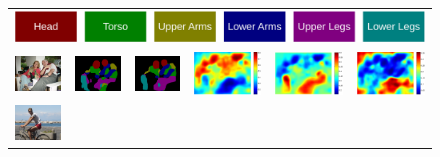 \begin{figure}
  \centering
  \begin{tabular}{c c c c c c}
   \multicolumn{6}{c}{\includegraphics[width=0.5\linewidth]{fig/voc10_part/legend.pdf}} \\
   \includegraphics[height=0.1\linewidth]{fig/voc10_part/img/2010_004786.jpg} &
   \includegraphics[height=0.1\linewidth]{fig/voc10_part/res_baseline/2010_004786.png} &
   \includegraphics[height=0.1\linewidth]{fig/voc10_part/res_sharenet/2010_004786.png} &
   \includegraphics[height=0.1\linewidth]{fig/voc10_part/att1/2010_004786.pdf} &
   \includegraphics[height=0.1\linewidth]{fig/voc10_part/att2/2010_004786.pdf} &
   \includegraphics[height=0.1\linewidth]{fig/voc10_part/att3/2010_004786.pdf} \\
   \includegraphics[height=0.1\linewidth]{fig/voc10_part/img/2010_002927.jpg} &

\end{tabular}
\end{figure}
